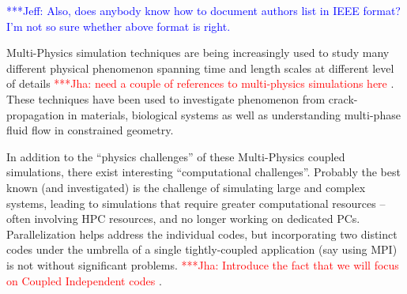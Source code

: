 \documentclass[times, 10pt,twocolumn]{article}
\newcommand{\jhanote}[1]{ {\textcolor{red} { ***Jha: #1 }}}
\newcommand{\skonote}[1]{ {\textcolor{blue} { ***Jeff: #1 }}}
\newcommand{\jhanote}[1]{}
\newcommand{\skonote}[1]{}
\begin{document}
\skonote{Also, does anybody know how to document authors list in IEEE format? I'm not so sure whether above format is right.}\\


Multi-Physics simulation techniques are being increasingly used to study many different physical phenomenon spanning time and length scales at different level of details\jhanote{need a couple of references to multi-physics simulations here}. These techniques have been used to investigate phenomenon from crack-propagation in materials, biological systems as well as understanding multi-phase fluid flow in constrained geometry.

In addition to the ``physics challenges'' of these Multi-Physics coupled simulations, there exist interesting ``computational challenges''.  Probably the best known (and investigated) is the challenge of simulating large and complex systems, leading to simulations that require greater computational resources -- often involving HPC resources, and no longer working on dedicated PCs. Parallelization helps address the individual codes, but incorporating two distinct codes under the umbrella of a single tightly-coupled application (say using MPI) is not without significant problems.  \jhanote{Introduce the fact that we will focus on Coupled Independent codes}. 
\end{document}
